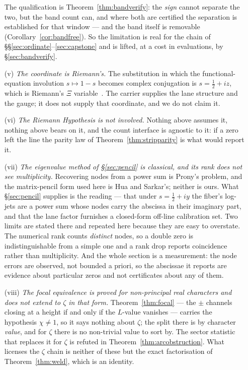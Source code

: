 \documentclass[11pt]{article}
\theoremstyle{plain}
\theoremstyle{definition}
\theoremstyle{remark}
\begin{document}
\begin{enumerate}
The qualification is Theorem~\ref{thm:bandverify}: the \emph{sign} cannot separate the
two, but the band count can, and where both are certified the separation is established
for that window --- and the band itself is removable (Corollary~\ref{cor:bandfree}). So
the limitation is real for the chain of
\S\S\ref{sec:ordinate}--\ref{sec:capstone} and is lifted, at a cost in evaluations, by
\S\ref{sec:bandverify}.

\item[(v)] \emph{The coordinate is Riemann's.} The substitution in which the
functional-equation involution $s\mapsto1-s$ becomes complex conjugation is
$s=\tfrac12+iz$, which is Riemann's $\Xi$ variable~\cite{Riemann1859}. The carrier supplies the
lane structure and the gauge; it does not supply that coordinate, and we do not claim
it.

\item[(vi)] \emph{The Riemann Hypothesis is not involved.} Nothing above assumes it,
nothing above bears on it, and the count interface is agnostic to it: if a zero left
the line the parity law of Theorem~\ref{thm:stripparity} is what would report it.

\item[(vii)] \emph{The eigenvalue method of \S\ref{sec:pencil} is classical, and its
rank does not see multiplicity.} Recovering nodes from a power sum is Prony's problem,
and the matrix-pencil form used here is Hua and Sarkar's; neither is ours. What
\S\ref{sec:pencil} supplies is the reading --- that under $s=\tfrac12+iy$ the fiber's
log-jets are a power sum whose nodes carry the abscissa in their imaginary part, and
that the lane factor furnishes a closed-form off-line calibration set. Two limits are
stated there and repeated here because they are easy to overstate. The numerical rank
counts \emph{distinct} nodes, so a double zero is indistinguishable from a simple one
and a rank drop reports coincidence rather than multiplicity. And the whole section is
a measurement: the node errors are observed, not bounded a priori, so the abscissae it
reports are evidence about particular zeros and not certificates about any of them.

\item[(viii)] \emph{The focal equivalence is proved for non-principal real characters
and does not extend to $\zeta$ in that form.} Theorem~\ref{thm:focal} --- the $\pm$
channels closing at a height if and only if the $L$-value vanishes --- carries the
hypothesis $\chi\ne1$, so it says nothing about $\zeta$; the split there is by
character \emph{value}, and for $\zeta$ there is no non-trivial value to sort by. The
sector statistic that replaces it for $\zeta$ is refuted in
Theorem~\ref{thm:arcobstruction}. What licenses the $\zeta$ chain is neither of these
but the exact factorisation of Theorem~\ref{thm:weld}, which is an identity.


\end{enumerate}
\end{document}
